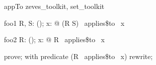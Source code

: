 
\begin{zsection}
 \SECTION appTo \parents zeves\_toolkit, set\_toolkit
\end{zsection}

\begin{theorem}{foo1}
   \forall R, S: \power(\nat \cross \nat); x: \nat @ (R \cup S) ~applies\$to~ x
\end{theorem}

\begin{theorem}{foo2}
   \forall R: \power(\nat \cross \nat); x: \nat @ R ~applies\$to~ x
\end{theorem}

\begin{zproof}[foo2]
   prove;
   with predicate (R~ applies\$to~ x) rewrite;
\end{zproof}

